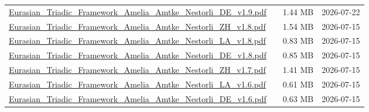 \documentclass[UTF8,fontset=fandol,10pt,a4paper]{ctexart}
\begin{document}
\begin{longtable}{@{}L{\dimexpr\linewidth-50mm-6\tabcolsep\relax}R{8mm}R{16mm}R{26mm}@{}}
\href{https://chatgpt.com/library?file_id=libfile_4abb190d556c8191bd31a69e5fbc5243&account_id=personal}{Eurasian\_\allowbreak{}Triadic\_\allowbreak{}Framework\_\allowbreak{}Amelia\_\allowbreak{}Amtke\_\allowbreak{}Nestorli\_\allowbreak{}DE\_\allowbreak{}v1.\allowbreak{}9.\allowbreak{}pdf} & \textemdash{} & 1.44 MB & 2026-07-22 \\
\href{https://chatgpt.com/library?file_id=libfile_c9ea558b7fb481918ea5d53061778e67&account_id=personal}{Eurasian\_\allowbreak{}Triadic\_\allowbreak{}Framework\_\allowbreak{}Amelia\_\allowbreak{}Amtke\_\allowbreak{}Nestorli\_\allowbreak{}ZH\_\allowbreak{}v1.\allowbreak{}8.\allowbreak{}pdf} & \textemdash{} & 1.54 MB & 2026-07-15 \\
\href{https://chatgpt.com/library?file_id=libfile_8409a22e448481919f2f31a740d3aaf8&account_id=personal}{Eurasian\_\allowbreak{}Triadic\_\allowbreak{}Framework\_\allowbreak{}Amelia\_\allowbreak{}Amtke\_\allowbreak{}Nestorli\_\allowbreak{}LA\_\allowbreak{}v1.\allowbreak{}8.\allowbreak{}pdf} & \textemdash{} & 0.83 MB & 2026-07-15 \\
\href{https://chatgpt.com/library?file_id=libfile_10ce9ac2de688191b57fe17b266b7b85&account_id=personal}{Eurasian\_\allowbreak{}Triadic\_\allowbreak{}Framework\_\allowbreak{}Amelia\_\allowbreak{}Amtke\_\allowbreak{}Nestorli\_\allowbreak{}DE\_\allowbreak{}v1.\allowbreak{}8.\allowbreak{}pdf} & \textemdash{} & 0.85 MB & 2026-07-15 \\
\href{https://chatgpt.com/library?file_id=libfile_05858e14a95881919761593e467633f6&account_id=personal}{Eurasian\_\allowbreak{}Triadic\_\allowbreak{}Framework\_\allowbreak{}Amelia\_\allowbreak{}Amtke\_\allowbreak{}Nestorli\_\allowbreak{}ZH\_\allowbreak{}v1.\allowbreak{}7.\allowbreak{}pdf} & \textemdash{} & 1.41 MB & 2026-07-15 \\
\href{https://chatgpt.com/library?file_id=libfile_fcff81e1d9bc8191b19e67593a1b6881&account_id=personal}{Eurasian\_\allowbreak{}Triadic\_\allowbreak{}Framework\_\allowbreak{}Amelia\_\allowbreak{}Amtke\_\allowbreak{}Nestorli\_\allowbreak{}LA\_\allowbreak{}v1.\allowbreak{}6.\allowbreak{}pdf} & \textemdash{} & 0.61 MB & 2026-07-15 \\
\href{https://chatgpt.com/library?file_id=libfile_aa2cba6b006c819181afb9c51d1de5ad&account_id=personal}{Eurasian\_\allowbreak{}Triadic\_\allowbreak{}Framework\_\allowbreak{}Amelia\_\allowbreak{}Amtke\_\allowbreak{}Nestorli\_\allowbreak{}DE\_\allowbreak{}v1.\allowbreak{}6.\allowbreak{}pdf} & \textemdash{} & 0.63 MB & 2026-07-15 \\

\end{longtable}
\end{document}
